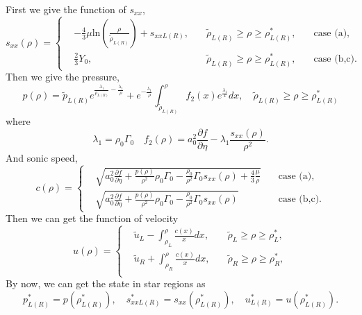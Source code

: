 \documentclass[review]{elsarticle}
\begin{document}
\begin{enumerate}[Step 1]
First we give the function of $s_{xx}$,
\begin{equation}
  s_{xx}(\rho) = \left\{\begin{aligned}
	  & -\frac{4}{3}\mu\text{ln}\left(\frac{\rho}{\tilde{\rho}_{L(R)}}\right)+s_{xxL(R)}, \quad & \tilde{\rho}_{L(R)} \ge \rho \ge \rho_{L(R)}^*,  \quad &\text{case (a)},\\
	  & \frac{2}{3}Y_0,  \quad & \tilde{\rho}_{L(R)} \ge \rho \ge \rho_{L(R)}^*,  \quad &\text{case (b,c)}.
  \end{aligned} \right.
  \end{equation}
Then we give the pressure,
\begin{equation}
  p(\rho)=\tilde{p}_{L(R)}e^{\frac{\lambda_1}{\rho_{L(R)}}-\frac{\lambda_1}{\rho}} +e^{-\frac{\lambda_1}{\rho}}\int_{\tilde{\rho}_{L(R)}}^{\rho} f_2(x) e^{\frac{\lambda_1}{x}}dx, \quad   \tilde{\rho}_{L(R)} \ge \rho \ge \rho_{L(R)}^*
\end{equation}
where 
\begin{equation}
  \lambda_1 = \rho_0 \Gamma_0 \quad f_2(\rho) = a_0^2\frac{\partial f}{\partial \eta}- \lambda_1\frac{s_{xx}(\rho)}{\rho^2}.
\end{equation}
And sonic speed,
\begin{equation}
  c(\rho) = \left\{ \begin{aligned}
	&  \sqrt{a_0^2 \frac{\partial f}{\partial \eta} + \frac{p(\rho)}{\rho^2}\rho_0\Gamma_0 -\frac{\rho_0}{\rho^2}\Gamma_0 s_{xx}(\rho) +\frac{4}{3}\frac{\mu}{\rho}} \quad & \text{case (a)},\\
	&	\sqrt{a_0^2 \frac{\partial f}{\partial \eta} + \frac{p(\rho)}{\rho^2}\rho_0\Gamma_0 -\frac{\rho_0}{\rho^2}\Gamma_0 s_{xx}(\rho)}  \quad  & \text{case (b,c)}.
	\end{aligned}\right.
\end{equation}
Then we can get  the  function of  velocity
\begin{equation}
  u(\rho) =\left\{ \begin{aligned} 
	  &\tilde{u}_L - \int_{\rho_L}^{\rho} \frac{c(x)}{x} dx, \quad  & \tilde{\rho}_L \ge \rho \ge \rho_L^*,   \\
	  &\tilde{u}_R + \int_{\rho_R}^{\rho} \frac{c(x)}{x} dx, \quad  & \tilde{\rho}_R \ge \rho \ge \rho_R^*, \\
	\end{aligned}
  \right.
\end{equation}
By now, we can get the state in star regions as
\begin{equation}
  p^*_{L(R)} = p(\rho_{L(R)}^*),\quad s_{xxL(R)}^* = s_{xx}(\rho_{L(R)}^*),\quad  u^*_{L(R)} = u(\rho_{L(R)}^*).
\end{equation}


\end{enumerate}
\end{document}
